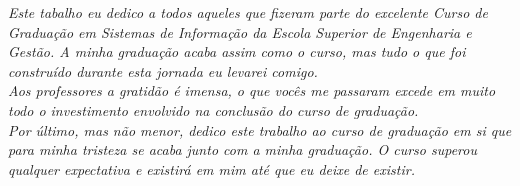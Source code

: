 \begin{dedicatoria}
   \vspace*{\fill}
   \centering
   \noindent
   \textit{ Este tabalho eu dedico a todos aqueles que fizeram parte do excelente Curso de Graduação em Sistemas de Informação da Escola Superior de Engenharia e Gestão. A minha graduação acaba assim como o curso, mas tudo o que foi construído durante esta jornada eu levarei comigo.
   \\ Aos professores a gratidão é imensa, o que vocês me passaram excede em muito todo o investimento envolvido na conclusão do curso de graduação.
   \\ Por último, mas não menor, dedico este trabalho ao curso de graduação em si que para minha tristeza se acaba junto com a minha graduação. O curso superou qualquer expectativa e existirá em mim até que eu deixe de existir.
   } \vspace*{\fill}
\end{dedicatoria}
